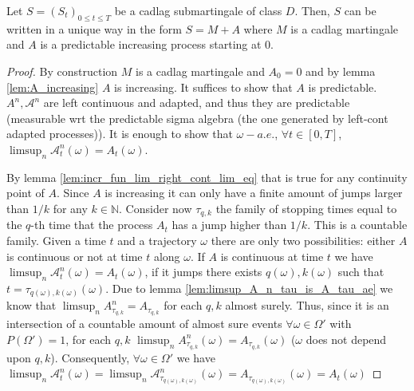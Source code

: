 \begin{theorem}\label{thm:Doob_Meyer}
  Let $S = (S_t )_{0\leq t\leq T}$ be a cadlag submartingale of class $D$.
  Then, $S$ can be written in a unique way in the form  $S = M + A$ where $M$ is a cadlag martingale and $A$ is a predictable increasing process starting at $0$.
\end{theorem}
\begin{proof}
  By construction $M$ is a cadlag martingale and $A_0=0$ and by lemma \ref{lem:A_increasing} $A$ is increasing. It suffices to show that $A$ is predictable.
  $A^n,\mathcal{A}^n$ are left continuous and adapted, and thus they are predictable (measurable wrt the predictable sigma algebra (the one generated by left-cont adapted processes)).
  It is enough to show that $\omega-a.e.$, $\forall t\in[0,T]$, $\limsup_n\mathcal{A}^n_t(\omega)=A_t(\omega)$.

  By lemma \ref{lem:incr_fun_lim_right_cont_lim_eq} that is true for any continuity point of $A$. Since $A$ is increasing it can only have a finite amount of jumps larger than $1/k$ for any $k\in\mathbb{N}$.
  Consider now $\tau_{q,k}$ the family of stopping times equal to the $q$-th time that the process $A_t$ has a jump higher than $1/k$. This is a countable family.
  Given a time $t$ and a trajectory $\omega$ there are only two possibilities: either $A$ is continuous or not at time $t$ along $\omega$.
  If $A$ is continuous at time $t$ we have $\limsup_n\mathcal{A}^n_t(\omega)=A_t(\omega)$, if it jumps there exists $q(\omega),k(\omega)$ such that $t=\tau_{q(\omega),k(\omega)}(\omega)$.
  Due to lemma \ref{lem:limsup_A_n_tau_is_A_tau_ae} we know that $\limsup_n A^n_{\tau_{q,k}} = A_{\tau_{q,k}}$ for each $q,k$ almost surely. Thus, since it is an intersection of a countable amount of almost sure
  events $\forall\omega\in\Omega'$ with $P(\Omega')=1$, for each $q,k$ $\limsup_n A^n_{\tau_{q,k}}(\omega) = A_{\tau_{q,k}}(\omega)$ ($\omega$ does not depend upon $q,k$).
  Consequently, $\forall\omega\in\Omega'$ we have $\limsup_n\mathcal{A}^n_t(\omega)=\limsup_n\mathcal{A}^n_{\tau_{q(\omega),k(\omega)}}(\omega)=A_{\tau_{q(\omega),k(\omega)}}(\omega)=A_t(\omega)$
\end{proof}
